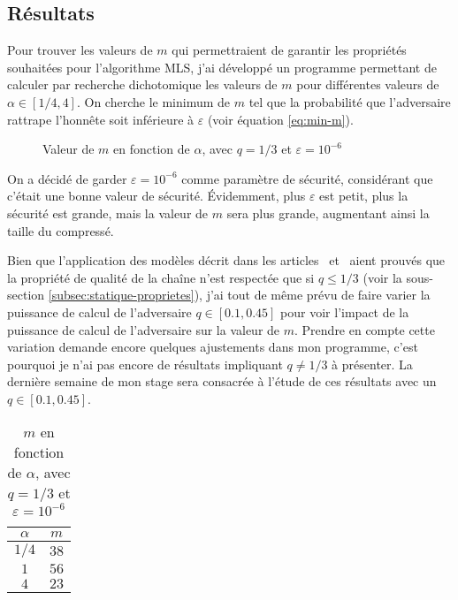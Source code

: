 	\subsection{Résultats}\label{subsec:ruin-resultats}
	
	Pour trouver les valeurs de $m$ qui permettraient de garantir les propriétés
	souhaitées pour l'algorithme MLS, j'ai développé un programme permettant de
	calculer par recherche dichotomique les valeurs de $m$ pour différentes
	valeurs de $\alpha \in [1/4, 4]$. On cherche le minimum de $m$ tel que la
	probabilité que l'adversaire rattrape l'honnête soit inférieure à $\varepsilon$
	(voir équation \ref{eq:min-m}).

	\vspace{0.4cm}
	\begin{figure}[h]
			\centering
			
			\caption{Valeur de $m$ en fonction de $\alpha$, avec $q = 1/3$ et
			$\varepsilon = 10^{-6}$}
			\label{fig:result-gamblers}
	\end{figure}
	
	On a décidé de garder $\varepsilon = 10^{-6}$ comme paramètre de sécurité,
	considérant que c'était une bonne valeur de sécurité. Évidemment, plus
	$\varepsilon$ est petit, plus la sécurité est grande, mais la valeur de $m$
	sera plus grande, augmentant ainsi la taille du compressé.

	Bien que l'application des modèles décrit dans les
	articles~\cite{static_backbone} et~\cite{dynamic_backbone} aient prouvés que
	la propriété de qualité de la chaîne n'est respectée que si $q \leq 1/3$ (voir
	la sous-section \ref{subsec:statique-proprietes}), j'ai tout de même prévu de
	faire varier la puissance de calcul de l'adversaire $q \in [0.1, 0.45]$ pour
	voir l'impact de la puissance de calcul de l'adversaire sur la valeur de $m$.
	Prendre en compte cette variation demande encore quelques ajustements dans mon
	programme, c'est pourquoi je n'ai pas encore de résultats impliquant $q \neq
	1/3$ à présenter. La dernière semaine de mon stage sera consacrée à l'étude de
	ces résultats avec un $q \in [0.1, 0.45]$.

	\begin{table}[h]
		\centering
		\begin{tabular}{|c||c|}
			\hline
			$\alpha$ & $m$ \\
			\hline
			$1/4$ & $38$ \\
			$1$ & $56$ \\
			$4$ & $23$ \\
			\hline
		\end{tabular}
		\caption{$m$ en fonction de $\alpha$, avec $q = 1/3$ et $\varepsilon =
		10^{-6}$}
		\label{tab:m_gambler}
	\end{table}


